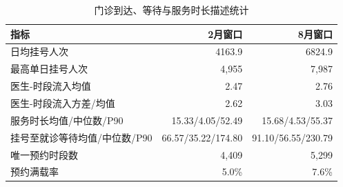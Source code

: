 \begin{table}[H]
  \centering
  \caption{门诊到达、等待与服务时长描述统计}
  \label{tab:descriptive-statistics}
  \begin{tabular}{lrr}
    \toprule
    指标 & 2月窗口 & 8月窗口 \\
    \midrule
    日均挂号人次 & 4163.9 & 6824.9 \\
    最高单日挂号人次 & 4,955 & 7,987 \\
    医生-时段流入均值 & 2.47 & 2.76 \\
    医生-时段流入方差/均值 & 2.62 & 3.03 \\
    服务时长均值/中位数/P90 & 15.33/4.05/52.49 & 15.68/4.53/55.37 \\
    挂号至就诊等待均值/中位数/P90 & 66.57/35.22/174.80 & 91.10/56.55/230.79 \\
    唯一预约时段数 & 4,409 & 5,299 \\
    预约满载率 & 5.0\% & 7.6\% \\
    \bottomrule
  \end{tabular}
\end{table}
